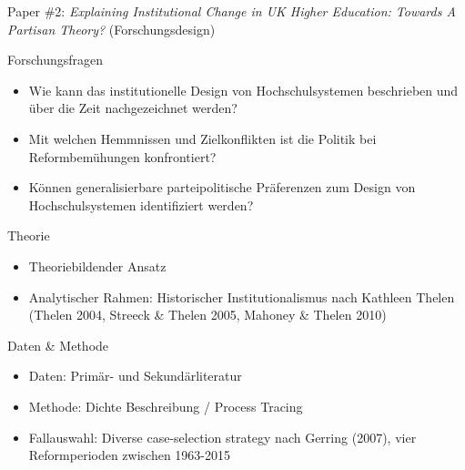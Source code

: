 \documentclass[
  ignorenonframetext,
]{beamer}
\begin{document}
\begin{frame}{Paper \#2: \emph{Explaining Institutional Change in UK
Higher Education: Towards A Partisan Theory?} (Forschungsdesign)}
\protect\hypertarget{paper-2-explaining-institutional-change-in-uk-higher-education-towards-a-partisan-theory-forschungsdesign}{}
\begin{block}{Forschungsfragen}
\scriptsize
\begin{itemize}
\item{Wie kann das institutionelle Design von Hochschulsystemen beschrieben und über die Zeit nachgezeichnet werden?}
\item{Mit welchen Hemmnissen und Zielkonflikten ist die Politik bei Reformbemühungen konfrontiert?}
\item{Können generalisierbare parteipolitische Präferenzen zum Design von Hochschulsystemen identifiziert werden?}
\end{itemize}
\end{block}

\pause

\begin{exampleblock}{Theorie}
\begin{itemize}
\scriptsize
\item{Theoriebildender Ansatz}
\item{Analytischer Rahmen: Historischer Institutionalismus nach Kathleen Thelen (Thelen 2004, Streeck \& Thelen 2005, Mahoney \& Thelen 2010)}
\end{itemize}
\end{exampleblock}

\pause

\begin{alertblock}{Daten \& Methode}
\begin{itemize}
\scriptsize
\item{Daten: Primär- und Sekundärliteratur}
\item{Methode: Dichte Beschreibung / Process Tracing}
\item{Fallauswahl: Diverse case-selection strategy nach Gerring (2007), vier Reformperioden zwischen 1963-2015}
\end{itemize}
\end{alertblock}
\end{frame}
\end{document}
